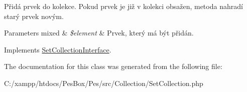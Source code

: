 Přidá prvek do kolekce. Pokud prvek je již v kolekci obsažen, metoda nahradí starý prvek novým.


\begin{DoxyParams}[1]{Parameters}
mixed & {\em \$element} & Prvek, který má být přidán. \\
\hline
\end{DoxyParams}


Implements \mbox{\hyperlink{interface_pes_1_1_collection_1_1_set_collection_interface}{Set\+Collection\+Interface}}.



The documentation for this class was generated from the following file\+:\begin{DoxyCompactItemize}
\item 
C\+:/xampp/htdocs/\+Pes\+Box/\+Pes/src/\+Collection/Set\+Collection.\+php\end{DoxyCompactItemize}

